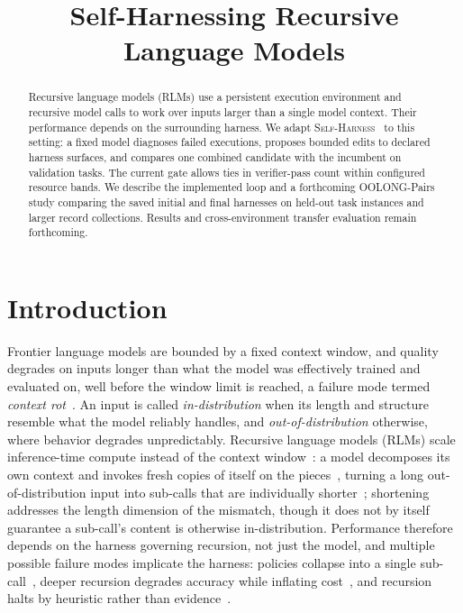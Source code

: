 \documentclass{article}
\title{Self-Harnessing Recursive Language Models}
\newcommand{\rlms}{\textsc{RLM}s\xspace}
\newcommand{\sh}{\textsc{Self-Harness}\xspace}
\begin{document}
\maketitle

\begin{abstract}
Recursive language models (\rlms) use a persistent execution environment and
recursive model calls to work over inputs larger than a single model context.
Their performance depends on the surrounding harness. We adapt
\sh{}~\citep{zhang2026selfharness} to this setting: a fixed model diagnoses failed
executions, proposes bounded edits to declared harness surfaces, and compares
one combined candidate with the incumbent on validation tasks. The current gate
allows ties in verifier-pass count within configured resource bands. We describe
the implemented loop and a forthcoming OOLONG-Pairs study comparing the saved
initial and final harnesses on held-out task instances and larger record
collections. Results and cross-environment transfer evaluation remain forthcoming.
\end{abstract}


\section{Introduction}
Frontier language models are bounded by a fixed context window, and quality degrades on
inputs longer than what the model was effectively trained and evaluated on, well before the
window limit is reached, a failure mode termed \emph{context rot}~\citep{hong2025contextrot}.
An input is called \emph{in-distribution} when its length and structure resemble what the model reliably handles, and \emph{out-of-distribution} otherwise, where behavior degrades unpredictably. Recursive language models (\rlms) scale inference-time compute instead of the
context window~\citep{snell2024scaling}: a model decomposes its own context and invokes fresh
copies of itself on the pieces~\citep{zhang2025rlm}, turning a long out-of-distribution input
into sub-calls that are individually shorter~\citep{zhang2026harness}; shortening addresses
the length dimension of the mismatch, though it does not by itself guarantee a sub-call's
content is otherwise in-distribution.
Performance therefore depends on the harness governing recursion, not just the model, and multiple possible failure modes implicate the harness:
policies collapse into a single sub-call~\citep{zhang2026harness},
deeper recursion degrades accuracy while inflating cost~\citep{wang2026overthink}, and recursion
halts by heuristic rather than evidence~\citep{guha2026termination}.
\end{document}
